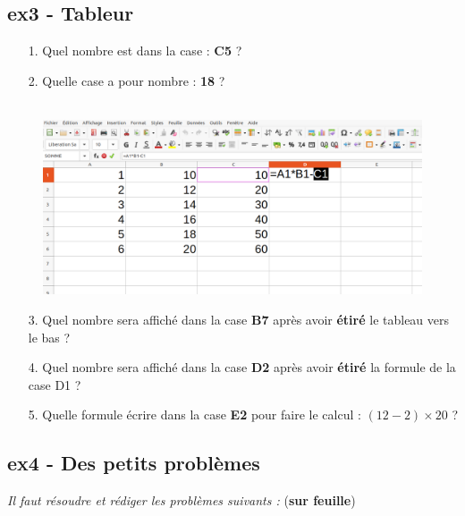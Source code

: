 \begin{minipage}[t]{0.45\textwidth}
  \subsection*{ex3 - Tableur}

  \begin{enumerate}
    \item[1.] Quel nombre est dans la case : \textbf{C5} ? \dotfill
    \item[2.] Quelle case a pour nombre : \textbf{18} ? \dotfill
  \end{enumerate}

\end{minipage}
\begin{minipage}[t]{0.5\textwidth}

  \begin{figure}[H]
        \centering
        \includegraphics[width=\linewidth]{4x2-proportionnalite/ie-tableur.png}
  \end{figure}

\end{minipage}

\begin{enumerate}
  \item[3.] Quel nombre sera affiché dans la case \textbf{B7} après avoir \textbf{étiré} le tableau vers le bas ? \dotfill
  \item[4.] Quel nombre sera affiché dans la case \textbf{D2} après avoir \textbf{étiré} la formule de la case D1 ? \dotfill
  \item[5.] Quelle formule écrire dans la case \textbf{E2} pour faire le calcul : $(12-2) \times 20$ ? \dotfill
\end{enumerate}

\newpage

\subsection*{ex4 - Des petits problèmes}
\textit{Il faut résoudre et rédiger les problèmes suivants :} (\textbf{sur feuille})

